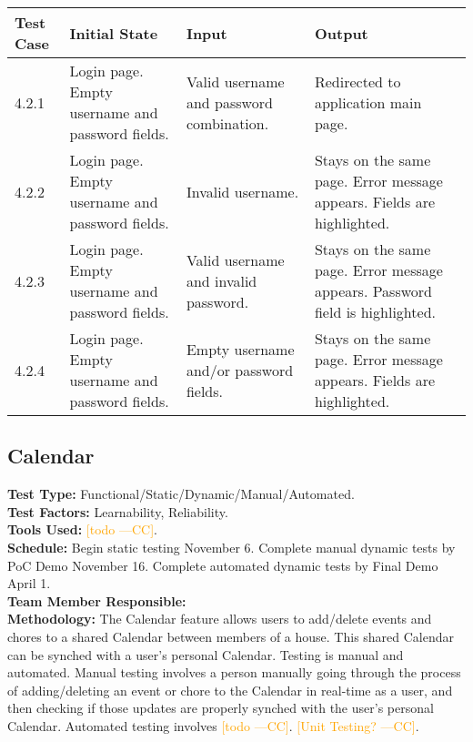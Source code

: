 \documentclass[12pt]{article}
\newcommand{\authornote}[3]{\textcolor{#1}{[#3 ---#2]}}
\newcommand{\authornote}[3]{}
\newcommand{\cc}[1]{\authornote{orange}{CC}{#1}}
\begin{document}
\begin{longtable}{|p{2cm}|p{3cm}|p{5cm}|p{5cm}|}
\hline
\textbf{Test Case}  & \textbf{Initial State} & \textbf{Input} & \textbf{Output} \\ \hline
4.2.1 & Login page. Empty username and password fields. & Valid username and password combination. & Redirected to application main page. \\ 
\hline
4.2.2 & Login page. Empty username and password fields. & Invalid username. & Stays on the same page. Error message appears. Fields are highlighted. \\
\hline
4.2.3 & Login page. Empty username and password fields. & Valid username and invalid password. & Stays on the same page. Error message appears. Password field is highlighted. \\
\hline
4.2.4 & Login page. Empty username and password fields. & Empty username and/or password fields. & Stays on the same page. Error message appears. Fields are highlighted. \\
\hline
\end{longtable}



\subsection{Calendar}
\textbf{Test Type:} Functional/Static/Dynamic/Manual/Automated. \\
\textbf{Test Factors:} Learnability, Reliability. \\
\textbf{Tools Used:} \cc{todo}. \\
\textbf{Schedule:} Begin static testing November 6. Complete manual dynamic tests by PoC Demo November 16. Complete automated dynamic tests by Final Demo April 1. \\
\textbf{Team Member Responsible:} \\
\textbf{Methodology:} The Calendar feature allows users to add/delete events and chores to a shared Calendar between members of a house. This shared Calendar can be synched with a user's personal Calendar. Testing is manual and automated. Manual testing involves a person manually going through the process of adding/deleting an event or chore to the Calendar in real-time as a user, and then checking if those updates are properly synched with the user's personal Calendar. Automated testing involves \cc{todo}. \cc{Unit Testing?}.
\end{document}
